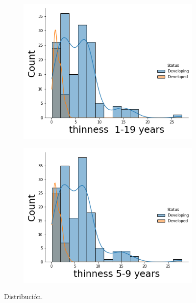 \begin{itemize}
\begin{figure}[H]
\begin{subfigure}{0.2\linewidth}
                \centering
                \includegraphics[width=\textwidth]{img/25.png}
              \end{subfigure}
                \hfill
                \begin{subfigure}{0.2\linewidth}
                \centering
                \includegraphics[width=\textwidth]{img/26.png}
              \end{subfigure}
               \caption{Distribución.}
               
               \label{fig: 17}
        \end{figure}
        

\end{itemize}
